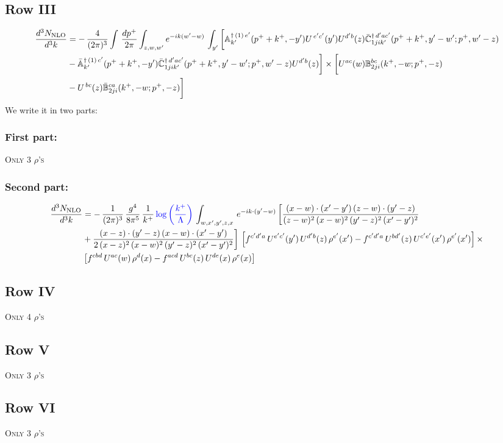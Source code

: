 \documentclass[9pt]{article}
\def\mf#1{\mathbb{#1}}
\numberwithin{equation}{section}
\begin{document}
 \subsection{Row III}
 \begin{align}
    \frac{d^{3}N_{\rm NLO}}{d^{3}k} & =   -\,\frac{4}{(2\pi)^{3}} \int\, \frac{dp^{+}}{2\pi}\int_{z,w,w^{\prime}} e^{-ik(w^{\prime}-w)}\,\int_{y^{\prime}}\bigg[\mf{A}^{\dagger\, (1)\,e^{\prime}}_{k^{\prime}}(p^{+}+k^{+},-y^{\prime})U^{\, e^{\prime}c^{\prime}}(y^{\prime})U^{d^{\prime}b}(z) \Bar{\mf{C}}^{\dagger\, d^{\prime}ac^{\prime}}_{1jik^{\prime}}(p^{+}+k^{+},y^{\prime}-w^{\prime}; p^{+},w^{\prime}-z)\notag \\ &  -\Bar{\mf{A}}^{\dagger\, (1)\,c^{\prime}}_{k^{\prime}}(p^{+}+k^{+},-y^{\prime}) \Bar{\mf{C}}^{\dagger\, d^{\prime}ac^{\prime}}_{1jik^{\prime}}(p^{+}+k^{+},y^{\prime}-w^{\prime}; p^{+},w^{\prime}-z)U^{d^{\prime}b}(z)\bigg] \times \bigg[U^{ac}(w) \mf{B}^{bc}_{2ji}(k^{+},-w;p^{+},-z)\notag \\ &  -U^{\, bc}(z)\Bar{\mf{B}}^{ca}_{2ji}(k^{+},-w; p^{+},-z)\bigg]\nonumber
\end{align}
We write it in two parts:
\subsubsection{First part:}
\textsc{Only 3 $\rho$'s}
\subsubsection{Second part:}
\begin{align}
 \frac{d^{3}N_{\rm NLO}}{d^{3}k} & =  -\, \frac{1}{(2\pi)^{3}}\,\frac{g^{4}}{8\pi^{5}}\,\frac{1}{k^{+}}\,{\color{blue}\log{\left(\frac{k^{+}}{\Lambda}\right)}}\,\int_{w,x',y',z,x}\, e^{-ik\cdot (y'-w)}\,\bigg[\frac{(x-w)\cdot (x'-y')\,(z-w)\cdot (y'-z)}{(z-w)^{2}\,(x-w)^{2}\,(y'-z)^{2}\,(x'-y')^{2}}\notag \\ & +\frac{(x-z)\cdot (y'-z)\,(x-w)\cdot (x'-y')}{2\,(x-z)^{2}\,(x-w)^{2}\,(y'-z)^{2}\,(x'-y')^{2}}\bigg]\, \left[f^{c'd'a}\,U^{e'c'}(y')\,U^{d'b}(z)\,\rho^{e'}(x')-f^{c'd'a}\, 
    U^{bd'}(z)\,U^{c'e'}(x')\,\rho^{e'}(x')\right]\times\notag \\ &  \left[f^{cbd}\,U^{ac}(w)\,\rho^{d}(x) -f^{acd}\,U^{bc}(z)\,U^{de}(x)\,\rho^{e}(x)\right] 
\end{align}
\subsection{Row IV}
\textsc{Only 4 $\rho$'s}
\subsection{Row V}
\textsc{Only 3 $\rho$'s}
\subsection{Row VI}
\textsc{Only 3 $\rho$'s}
\end{document}
